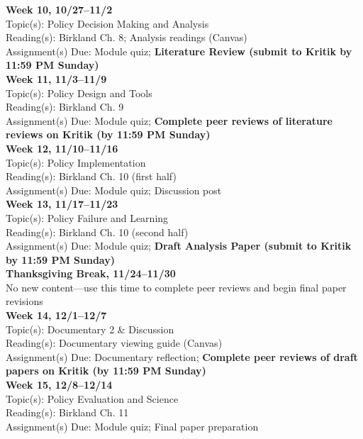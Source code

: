 \documentclass[12pt]{article}     %
\begin{document}
\noindent \textbf{Week 10, 10/27--11/2}\\
Topic(s): Policy Decision Making and Analysis\\
Reading(s): Birkland Ch. 8; Analysis readings (Canvas)\\
Assignment(s) Due: Module quiz; \textbf{Literature Review (submit to Kritik by 11:59 PM Sunday)}\\

\noindent \textbf{Week 11, 11/3--11/9}\\
Topic(s): Policy Design and Tools\\
Reading(s): Birkland Ch. 9\\
Assignment(s) Due: Module quiz; \textbf{Complete peer reviews of literature reviews on Kritik (by 11:59 PM Sunday)}\\

\noindent \textbf{Week 12, 11/10--11/16}\\
Topic(s): Policy Implementation\\
Reading(s): Birkland Ch. 10 (first half)\\
Assignment(s) Due: Module quiz; Discussion post\\

\noindent \textbf{Week 13, 11/17--11/23}\\
Topic(s): Policy Failure and Learning\\
Reading(s): Birkland Ch. 10 (second half)\\
Assignment(s) Due: Module quiz; \textbf{Draft Analysis Paper (submit to Kritik by 11:59 PM Sunday)}\\

\noindent \textbf{Thanksgiving Break, 11/24--11/30}\\
No new content---use this time to complete peer reviews and begin final paper revisions\\

\noindent \textbf{Week 14, 12/1--12/7}\\
Topic(s): Documentary 2 \& Discussion\\
Reading(s): Documentary viewing guide (Canvas)\\
Assignment(s) Due: Documentary reflection; \textbf{Complete peer reviews of draft papers on Kritik (by 11:59 PM Sunday)}\\

\noindent \textbf{Week 15, 12/8--12/14}\\
Topic(s): Policy Evaluation and Science\\
Reading(s): Birkland Ch. 11\\
Assignment(s) Due: Module quiz; Final paper preparation\\
\end{document}

